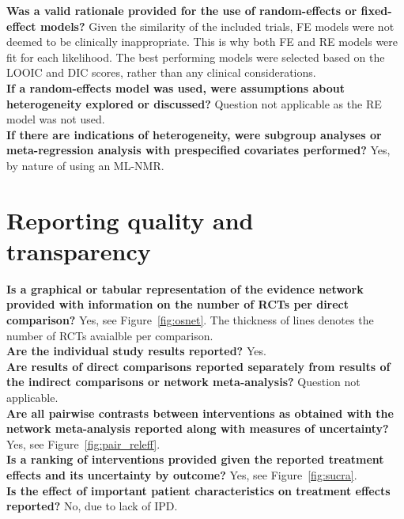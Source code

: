 \textbf{Was a valid rationale provided for the use of random-effects
or fixed-effect models?} Given the similarity of the included trials, FE models were not deemed to be clinically inappropriate. This is why both FE and RE models were fit for each likelihood. The best performing models were selected based on the LOOIC and DIC scores, rather than any clinical considerations. \\

\textbf{If a random-effects model was used, were assumptions
about heterogeneity explored or discussed?} Question not applicable as the RE model was not used.\\

\textbf{If there are indications of heterogeneity, were subgroup
analyses or meta-regression analysis with prespecified
covariates performed?} Yes, by nature of using an ML-NMR.\\

\section{Reporting quality and transparency}

\textbf{Is a graphical or tabular representation of the evidence
network provided with information on the number of RCTs per
direct comparison?} Yes, see Figure~\ref{fig:osnet}. The thickness of lines denotes the number of RCTs avaialble per comparison. \\

\textbf{Are the individual study results reported?} Yes.\\

\textbf{Are results of direct comparisons reported separately from
results of the indirect comparisons or network meta-analysis?} Question not applicable.\\

\textbf{Are all pairwise contrasts between interventions as obtained
with the network meta-analysis reported along with measures
of uncertainty?} Yes, see Figure~\ref{fig:pair_releff}.\\

\textbf{Is a ranking of interventions provided given the reported
treatment effects and its uncertainty by outcome?} Yes, see Figure~\ref{fig:sucra}. \\

\textbf{Is the effect of important patient characteristics on treatment
effects reported?} No, due to lack of IPD. \\

